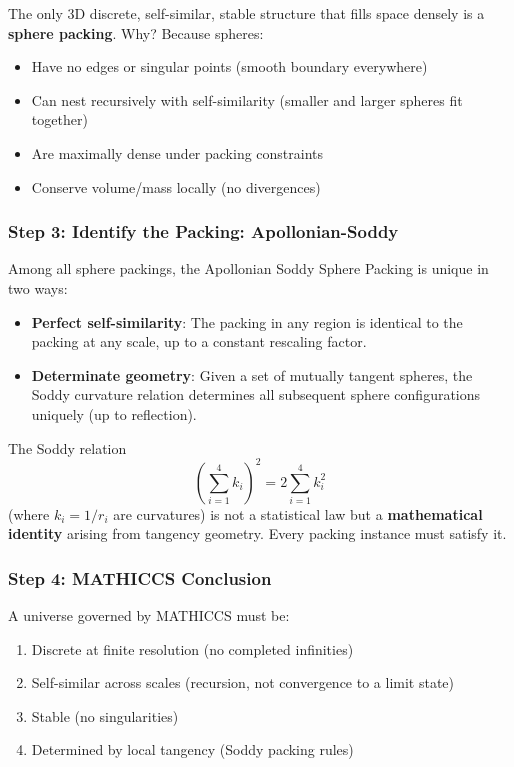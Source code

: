 \documentclass[11pt,a4paper]{article}
\begin{document}
  The only 3D discrete, self-similar, stable structure that fills space densely is a \textbf{sphere packing}. Why? Because spheres:
  \begin{itemize}
  \item Have no edges or singular points (smooth boundary everywhere)
  \item Can nest recursively with self-similarity (smaller and larger spheres fit together)
  \item Are maximally dense under packing constraints
  \item Conserve volume/mass locally (no divergences)
  \end{itemize}

  \subsubsection{Step 3: Identify the Packing: Apollonian-Soddy}

  Among all sphere packings, the Apollonian Soddy Sphere Packing is unique in two ways:

  \begin{itemize}
  \item \textbf{Perfect self-similarity}: The packing in any region is identical to the packing at any scale, up to a constant rescaling factor.
  \item \textbf{Determinate geometry}: Given a set of mutually tangent spheres, the Soddy curvature relation determines all subsequent sphere configurations uniquely (up to reflection).
  \end{itemize}

  The Soddy relation
  \[
  \left(\sum_{i=1}^4 k_i\right)^2 = 2\sum_{i=1}^4 k_i^2
  \]
  (where $k_i = 1/r_i$ are curvatures) is not a statistical law but a \textbf{mathematical identity} arising from tangency geometry. Every packing instance must satisfy it.

  \subsubsection{Step 4: MATHICCS Conclusion}

  A universe governed by MATHICCS must be:
  \begin{enumerate}
  \item Discrete at finite resolution (no completed infinities)
  \item Self-similar across scales (recursion, not convergence to a limit state)
  \item Stable (no singularities)
  \item Determined by local tangency (Soddy packing rules)
  \end{enumerate}
\end{document}
